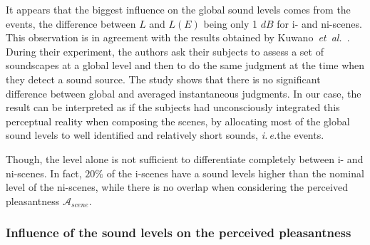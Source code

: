 \documentclass[12pt]{elsarticle}
\newcommand{\ie}{\emph{i.\,e.}}
\newcommand{\al}{\emph{et~al.}}
\begin{document}

It appears that the biggest influence on the global sound levels comes from the events, the difference between $L$ and $L(E)$ being only 1 $dB$ for i- and ni-scenes. This observation is in agreement with the results obtained by Kuwano~\al~\cite{kuwano_memory_2003}. During their experiment, the authors ask their subjects to assess a set of soundscapes at a global level and then to do the same judgment at the time when they detect a sound source. The study shows that there is no significant difference between global and averaged instantaneous judgments. In our case, the result can be interpreted as if the subjects had unconsciously integrated this perceptual reality when composing the scenes, by allocating most of the global sound levels to well identified and relatively short sounds, \ie the events.


Though, the level alone is not sufficient to differentiate completely between i- and ni-scenes. In fact, $20\%$ of the i-scenes have a sound levels higher than the nominal level of the ni-scenes, while there is no overlap when considering the perceived pleasantness $\mathcal{A}_{scene}$.

\subsubsection*{Influence of the sound levels on the perceived pleasantness}
\end{document}
